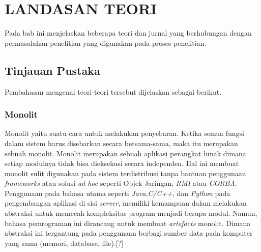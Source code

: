 \chapter{LANDASAN TEORI}
\vspace{4.5pt}
Pada bab ini menjelaskan beberapa teori dan jurnal yang berhubungan dengan permasalahan penelitian yang digunakan pada proses penelitian.
\section{Tinjauan Pustaka}
Pembahasan mengenai teori-teori tersebut dijelaskan sebagai berikut.
\subsection{Monolit}
Monolit yaitu suatu cara untuk melakukan penyebaran. Ketika semua fungsi dalam sistem harus disebarkan secara bersama-sama, maka itu merupakan sebuah monolit.\cite{6} Monolit merupakan sebuah aplikasi perangkat lunak dimana setiap modulnya tidak bisa dieksekusi secara independen. Hal ini membuat monolit sulit digunakan pada sistem terdistribusi tanpa bantuan penggunaan \textit{frameworks} atau solusi \textit{ad hoc} seperti Objek Jaringan, \textit{RMI} atau \textit{CORBA}.
Penggunaan pada bahasa utama seperti \textit{Java},\textit{C/C++}, dan \textit{Python} pada pengembangan aplikasi di sisi \textit{server}, memiliki kemampuan dalam melakukan abstraksi untuk memecah kompleksitas program menjadi berupa modul. Namun, bahasa pemrograman ini dirancang untuk membuat \textit{artefacts} monolit. Dimana abstraksi ini tergantung pada penggunaan berbagi sumber data pada komputer yang sama (memori, database, file).[?] 


